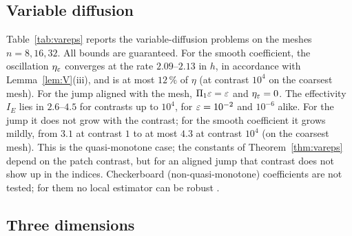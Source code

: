 

\subsection{Variable diffusion}\label{sec:num-vareps}

Table~\ref{tab:vareps} reports the variable-diffusion problems on the meshes $n=8,16,32$. All bounds are
guaranteed. For the smooth coefficient, the oscillation $\eta_\varepsilon$ converges at the rate $2.09$--$2.13$
in $h$, in accordance with Lemma~\ref{lem:V}(iii), and is at most $12\,\%$ of $\eta$ (at contrast $10^4$ on
the coarsest mesh). For the jump aligned with the mesh, $\Pi_1\varepsilon=\varepsilon$ and $\eta_\varepsilon=0$. The
effectivity $I_E$ lies in $2.6$--$4.5$ for contrasts up to $10^4$, for $\varepsilon=10^{-2}$ and $10^{-6}$ alike. For
the jump it does not grow with the contrast; for the smooth coefficient it grows mildly, from
$3.1$ at contrast $1$ to at most $4.3$ at contrast $10^4$ (on the coarsest mesh). This is the quasi-monotone case; the constants of
Theorem~\ref{thm:vareps} depend on the patch contrast, but for an aligned jump that contrast does not
show up in the indices. Checkerboard (non-quasi-monotone) coefficients are not tested; for them no
local estimator can be robust \cite{Li26}.



\subsection{Three dimensions}\label{sec:num-3d}

